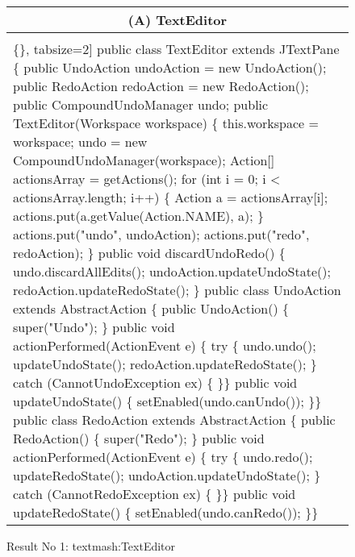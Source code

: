 \begin{figure}[!htb]
 \begin{minipage}{0.5\textwidth}
\scriptsize 
\begin{tabular}{@{}p{}} 
 \hline 
  \multicolumn{1}{c}{(A) TextEditor} \\ \hline
  \vspace{-4mm}
\begin{Verbatim}[commandchars=\\\{\}, tabsize=2]
public class TextEditor extends JTextPane \{
 public UndoAction undoAction = new UndoAction();
 public RedoAction redoAction = new RedoAction();
 public CompoundUndoManager undo;
 public TextEditor(Workspace workspace) \{
  this.workspace = workspace;
  undo = new CompoundUndoManager(workspace);
  Action[] actionsArray = getActions();
  for (int i = 0; i < actionsArray.length; i++) \{
   Action a = actionsArray[i];
   actions.put(a.getValue(Action.NAME), a);
   \}
   actions.put("undo", undoAction);
   actions.put("redo", redoAction);
   \}
   public void discardUndoRedo() \{
    undo.discardAllEdits();
    undoAction.updateUndoState();
    redoAction.updateRedoState();
   \}
  public class UndoAction extends AbstractAction \{
   public UndoAction() \{
    super("Undo");
   \}
   public void actionPerformed(ActionEvent e) \{
    try \{
     undo.undo();
     updateUndoState();
     redoAction.updateRedoState();
    \} catch (CannotUndoException ex) \{
    \}\}
   public void updateUndoState() \{
    setEnabled(undo.canUndo());
   \}\}
   public class RedoAction extends AbstractAction \{
    public RedoAction() \{
     super("Redo");
    \}
    public void actionPerformed(ActionEvent e) \{
     try \{
      undo.redo();
      updateRedoState();
      undoAction.updateUndoState();
     \} catch (CannotRedoException ex) \{
     \}\}
      public void updateRedoState() \{
       setEnabled(undo.canRedo());
     \}\}
  \end{Verbatim}
      \vspace{-4mm}
     \\ \hline
\end{tabular} 
\caption{Result No 1: textmash:TextEditor}
\label{fig:textEditor}
\end{minipage}
\end{figure}





